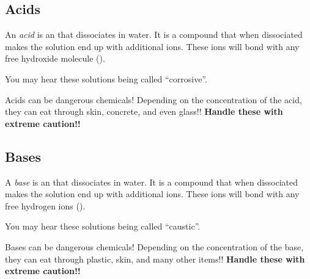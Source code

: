 \subsection{Acids} \label{subsec:Acids}
\begin{definition}[Acid] \label{def:Acid}
  An \emph{acid} is an  that dissociates in water.
  It is a compound that when dissociated makes the solution end up with additional  ions.
  These ions will bond with any free hydroxide molecule ().
  \begin{remark}
    You may hear these solutions being called ``corrosive''.
  \end{remark}
  \begin{remark}
    Acids can be dangerous chemicals!
    Depending on the concentration of the acid, they can eat through skin, concrete, and even glass!!
    \textbf{Handle these with extreme caution!!}
  \end{remark}
\end{definition}
\subsection{Bases} \label{subsec:Bases}
\begin{definition}[Base] \label{def:Base}
  A \emph{base} is an  that dissociates in water.
  It is a compound that when dissociated makes the solution end up with additional  ions.
  These ions will bond with any free hydrogen ions ().
  \begin{remark}
    You may hear these solutions being called ``caustic''.
  \end{remark}
  \begin{remark}
    Bases can be dangerous chemicals!
    Depending on the concentration of the base, they can eat through plastic, skin, and many other items!!
    \textbf{Handle these with extreme caution!!}
  \end{remark}
\end{definition}
